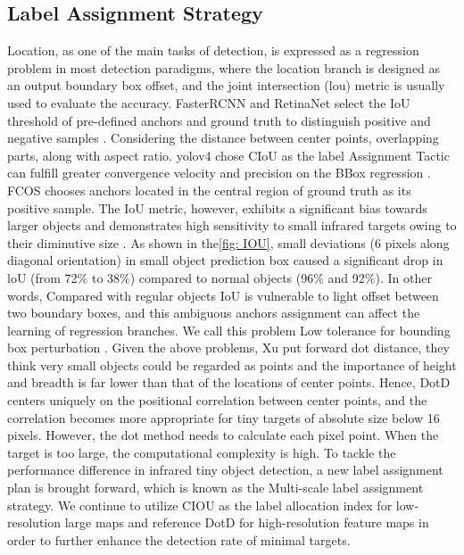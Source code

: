 \documentclass[journal]{IEEEtran}
\begin{document}
\subsection{Label Assignment Strategy}
Location, as one of the main tasks of detection, is expressed as a regression problem in most detection paradigms, where the location branch is designed as an output boundary box offset, and the joint intersection (lou) metric is usually used to evaluate the accuracy\cite{zhu2021tph}. FasterRCNN and RetinaNet select the IoU threshold of pre-defined anchors and ground truth to distinguish positive and negative samples \cite{ren2015faster}\cite{lin2017focal}. Considering the distance between center points, overlapping parts, along with aspect ratio. yolov4 chose CIoU as the label Assignment Tactic can fulfill greater convergence velocity and precision on the BBox regression \cite{bochkovskiy2020yolov4}.  FCOS chooses anchors located in the central region of ground truth as its positive sample\cite{tian2019fcos}. The IoU metric, however, exhibits a significant bias towards larger objects and demonstrates high sensitivity to small infrared targets owing to their diminutive size . As shown in the\ref{fig: IOU}, small deviations (6 pixels along diagonal orientation) in small object prediction box caused a significant drop in loU (from 72$\%$ to 38$\%$) compared to normal objects (96$\%$ and 92$\%$). In other words, Compared with regular objects IoU is vulnerable to light offset between two boundary boxes, and this ambiguous anchors assignment can affect the learning of regression branches\cite{xu2021dot}. We call this problem Low tolerance for bounding box perturbation \cite{zhao2022single}.  Given the above problems,  Xu put forward dot distance, they think very small objects could be regarded as points and the importance of height and breadth is far lower than that of the locations of center points. Hence, DotD centers uniquely on the positional correlation between center points, and the correlation becomes more appropriate for tiny targets of absolute size below 16 pixels\cite{xu2021dot}. However, the dot method needs to calculate each pixel point. When the target is too large, the computational complexity is high. To tackle the performance difference in infrared tiny object detection, a new label assignment plan is brought forward, which is known as the Multi-scale label assignment strategy. We continue to utilize CIOU as the label allocation index for low-resolution large maps and reference DotD for high-resolution feature maps in order to further enhance the detection rate of minimal targets.
\end{document}
